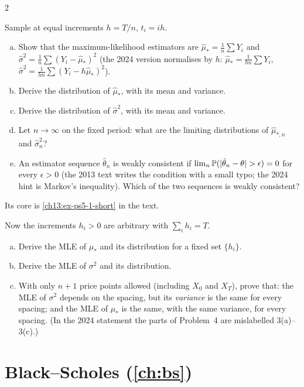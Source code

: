 \begin{paracol}{2}
\begin{exercise}\label{ch13:ex-ps5-1}
Sample at equal increments $h=T/n$, $t_i=ih$.
\begin{enumerate}[(a)]
  \item Show that the maximum-likelihood estimators are $\hat\mu_*=\frac1n\sum Y_i$ and $\hat\sigma^2=\frac1n\sum(Y_i-\hat\mu_*)^2$ (the 2024 version normalises by $h$:
      $\hat\mu_*=\frac1{hn}\sum Y_i$, $\hat\sigma^2=\frac1{hn}\sum(Y_i-h\hat\mu_*)^2$).
  \item Derive the distribution of $\hat\mu_*$, with its mean and variance.
  \item Derive the distribution of $\hat\sigma^2$, with its mean and variance.
  \item Let $n\to\infty$ on the fixed period: what are the limiting distributions of $\hat\mu_{*,n}$ and $\hat\sigma^2_n$?
  \item An estimator sequence $\hat\theta_n$ is weakly consistent if $\lim_n\Prob(|\hat\theta_n-\theta|>\epsilon)=0$ for every $\epsilon>0$ (the 2013 text writes the condition with a small typo; the 2024 hint is Markov's inequality). Which of the two sequences is weakly consistent?
\end{enumerate}
Its core is \cref{ch13:ex-ps5-1-short} in the text.
\end{exercise}

\begin{exercise}\label{ch13:ex-ps5-2}
Now the increments $h_i>0$ are arbitrary with $\sum_ih_i=T$.
\begin{enumerate}[(a)]
  \item Derive the MLE of $\mu_*$ and its distribution for a fixed set $\{h_i\}$.
  \item Derive the MLE of $\sigma^2$ and its distribution.
  \item With only $n+1$ price points allowed (including $X_0$ and $X_T$), prove that: the MLE of $\sigma^2$
      depends on the spacing, but its \emph{variance} is the same for every spacing; and the MLE of $\mu_*$ is the same, with the same variance, for every spacing. (In the 2024 statement the parts of Problem~4 are mislabelled 3(a)--3(c).)
\end{enumerate}
\end{exercise}

\section{Black--Scholes (\cref{ch:bs})}\label{exam:ch15}


\end{paracol}
